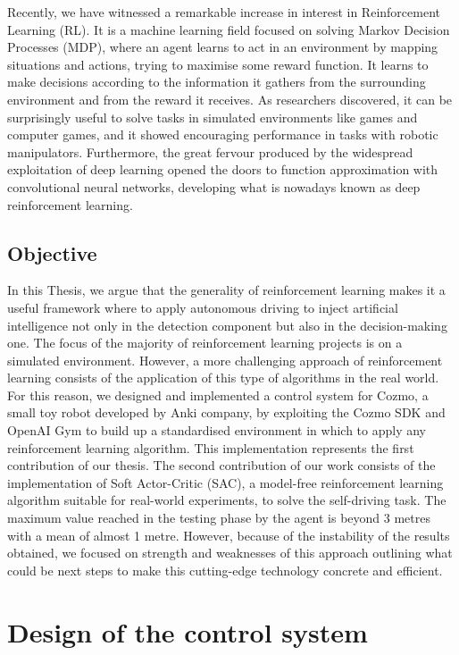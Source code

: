 \documentclass[10pt,twocolumn,letterpaper]{article}
\begin{document}
Recently, we have witnessed a remarkable increase in interest in Reinforcement Learning (RL).
It is a machine learning field focused on solving Markov Decision Processes (MDP), where an agent learns to act in an environment by mapping situations and actions, trying to maximise some reward function.
It learns to make decisions according to the information it gathers from the surrounding environment and from the reward it receives.
As researchers discovered, it can be surprisingly useful to solve tasks in simulated environments like games and computer games, and it showed encouraging performance in tasks with robotic manipulators.
Furthermore, the great fervour produced by the widespread exploitation of deep learning opened the doors to function approximation with convolutional neural networks, developing what is nowadays known as deep reinforcement learning.

\subsection{Objective}
In this Thesis, we argue that the generality of reinforcement learning makes it a useful framework where to apply autonomous driving to inject artificial intelligence not only in the detection component but also in the decision-making one.
The focus of the majority of reinforcement learning projects is on a simulated environment. However, a more challenging approach of reinforcement learning consists of the application of this type of algorithms in the real world.
For this reason, we designed and implemented a control system for Cozmo, a small toy robot developed by Anki company, by exploiting the Cozmo SDK and OpenAI Gym to build up a standardised environment in which to apply any reinforcement learning algorithm. This implementation represents the first contribution of our thesis. The second contribution of our work consists of the implementation of Soft Actor-Critic (SAC), a model-free reinforcement learning algorithm suitable for real-world experiments, to solve the self-driving task. The maximum value reached in the testing phase by the agent is beyond 3 metres with a mean of almost 1 metre. However, because of the instability of the results obtained, we focused on strength and weaknesses of this approach outlining what could be next steps to make this cutting-edge technology concrete and efficient.

\section{Design of the control system}
\end{document}
